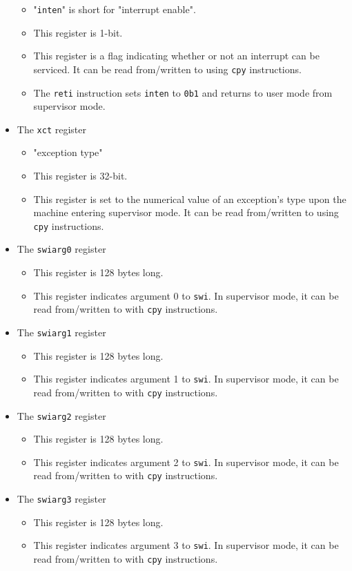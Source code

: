 \documentclass{article}
\begin{document}
\begin{itemize}
		\begin{itemize}
		\item "\texttt{inten}" is short for "interrupt enable".
		\item This register is 1-bit.
		\item This register is a flag indicating whether or not an
			interrupt can be serviced. It can be read from/written to using
			\texttt{cpy} instructions.
		\item The \texttt{reti} instruction sets \texttt{inten} to
			\texttt{0b1} and returns to user mode from supervisor mode.
		\end{itemize}
	\item The \texttt{xct} register
		\begin{itemize}
		\item "exception type"
		\item This register is 32-bit.
		\item This register is set to the numerical value of an exception's
			type upon the machine entering supervisor mode. It can be read
			from/written to using \texttt{cpy} instructions.
		\end{itemize}
	\item The \texttt{swiarg0} register
		\begin{itemize}
		\item This register is 128 bytes long.
		\item This register indicates argument 0 to \texttt{swi}. In
			supervisor mode, it can be read from/written to with
			\texttt{cpy} instructions.
		\end{itemize}
	\item The \texttt{swiarg1} register
		\begin{itemize}
		\item This register is 128 bytes long.
		\item This register indicates argument 1 to \texttt{swi}. In
			supervisor mode, it can be read from/written to with
			\texttt{cpy} instructions.
		\end{itemize}
	\item The \texttt{swiarg2} register
		\begin{itemize}
		\item This register is 128 bytes long.
		\item This register indicates argument 2 to \texttt{swi}. In
			supervisor mode, it can be read from/written to with
			\texttt{cpy} instructions.
		\end{itemize}
	\item The \texttt{swiarg3} register
		\begin{itemize}
		\item This register is 128 bytes long.
		\item This register indicates argument 3 to \texttt{swi}. In
			supervisor mode, it can be read from/written to with
			\texttt{cpy} instructions.
		\end{itemize}
	\end{itemize}
	\newpage
\end{document}
